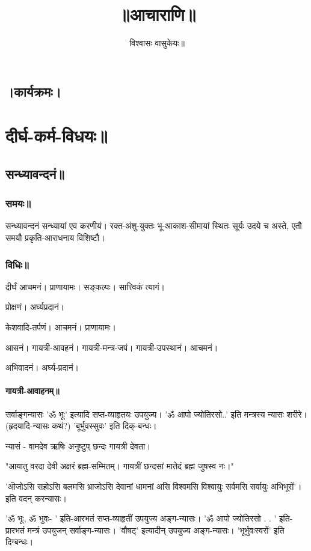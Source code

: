 \documentclass[oneside, article]{memoir}
\title{॥आचाराणि॥}
\author{विश्वासः वासुकेयः॥}
\begin{document}
\maketitle

\tableofcontents

\chapter{।कार्यक्रमः।}
\part{दीर्घ-कर्म-विधयः॥}
\chapter{सन्ध्यावन्दनं॥}
\section{समयः॥}
सन्ध्यावन्दनं सन्ध्यायां एव करणीयं। रक्त-अंशु-युक्तः भू-आकाश-सीमायां स्थितः सूर्यः उदये च अस्ते, एतौ समयौ प्रकृति-आराधनाय विशिष्टौ।

\section{विधिः॥}
दीर्घं आचमनं। प्राणायामः। सङ्कल्पः। सात्त्विकं त्यागं।

प्रोक्षणं। अर्घ्यप्रदानं।

केशवादि-तर्पणं। आचमनं। प्राणायामः।

आसनं। गायत्री-आवहनं। गायत्री-मन्त्र-जपं। गायत्री-उपस्थानं। आचमनं।

अभिवादनं। अर्घ्य-प्रदानं।

\subsection{गायत्री-आवाहनम्॥}
सर्वाङ्गन्यासः 'ॐ भूः' इत्यादि सप्त-व्याहृतयः उपयुज्य। 'ॐ आपो ज्योतिरसो..' इति मन्त्रस्य न्यासः शरीरे। (हृदयादि-न्यासः कथं?) 'बूर्भुवस्सुवः' इति दिक्-बन्धः।

न्यासं - वामदेव ऋषिः अनुष्टुप्‌ छन्दः गायत्री देवता।

"आयातु वरदा देवी अक्षरं ब्रह्म-सम्मितम्। गायत्रीं छन्दसां मातेदं ब्रह्म जुषस्व नः।" 

'ऒजोऽसि सहोऽसि बलमसि भ्राजोऽसि देवानां धामनां असि विश्वमसि विश्वायुः सर्वमसि सर्वायुः अभिभूरों'। इति वदन् करन्यासः।

'ॐ भूः, ॐ भुवः- ' इति-आरभतं सप्त-व्याहृतीं उपयुज्य अङ्ग-न्यासः। 'ॐ आपो ज्योतिरसो . . ' इति-प्रारभतं मन्त्रं उपयुजन् सर्वाङ्ग-न्यासः। 'वौषट्' इत्यादीन् उपयुज्य अङ्ग-न्यासः। 'भूर्भुवःस्वरों' इति दिग्बन्धः।
\end{document}
